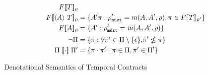 {\begin{align*}
{        \denotetconfulle{\mtcon}{\menv}}
      \\
     \denotetconfulle{\stbind{\mevent}{\mtcon}}{\menv} &=
     \setbuild{\mevent' \mtrace}{\menv'_\must = \matches(\mevent, \mevent',
       \menv), \mtrace \in \denotetconfulle{\mtcon}{\menv'}}
     \\
      \denotetconfulle{\mevent}{\menv} &= \setbuild{\mevent'}{\menv'_\must =
        \matches(\mevent, \mevent', \menv)}
      \\[2pt]
      \semneg{\Pi} &= \setbuild{\mtrace}{\forall \mtrace' \in
        \Pi\setminus\setof{\epsilon}. \mtrace' \nleq \mtrace}
      \\
      \Pi \semseq \Pi' &= \setbuild{\mtrace \cdot \mtrace'}{\mtrace
        \in \Pi, \mtrace' \in \Pi'}
    \end{align*}}{\caption{Denotational Semantics of Temporal Contracts}\label{fig:tcontract-denotation}}
